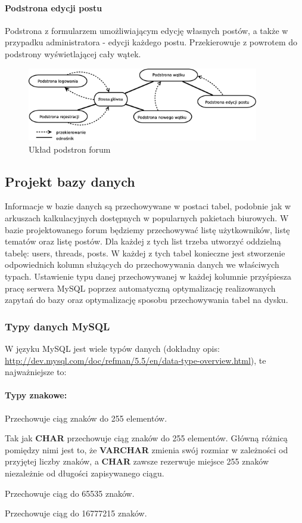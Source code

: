 \documentclass[a4paper,10pt]{article}
\renewenvironment{description}[1][0pt]
	{\list{}{\labelwidth=0pt \leftmargin=#1
	\let\makelabel\descriptionlabel}}
	{\endlist}
\begin{document}
\paragraph{Podstrona edycji postu} Podstrona z formularzem umożliwiającym edycję własnych postów, a także w przypadku administratora - edycji każdego postu. Przekierowuje z powrotem do podstrony wyświetlającej cały wątek. \\

\begin{figure}[htbp]
\centering
\includegraphics[width=0.9\textwidth]{subp.eps}
\caption{Układ podstron forum}
\end{figure}


\subsection{Projekt bazy danych}
Informacje w bazie danych są przechowywane w postaci tabel, podobnie jak w arkuszach kalkulacyjnych dostępnych w popularnych pakietach biurowych. W bazie projektowanego forum będziemy przechowywać listę użytkowników, listę tematów oraz listę postów. Dla każdej z tych list trzeba utworzyć oddzielną tabelę: users, threads, posts. W każdej z tych tabel konieczne jest stworzenie odpowiednich kolumn służących do przechowywania danych we właściwych typach. Ustawienie typu danej przechowywanej w każdej kolumnie przyśpiesza pracę serwera MySQL poprzez automatyczną optymalizację realizowanych zapytań do bazy oraz optymalizację sposobu przechowywania tabel na dysku.
\subsubsection{Typy danych MySQL}
W języku MySQL jest wiele typów danych 
(dokładny opis: \href{http://dev.mysql.com/doc/refman/5.5/en/data-type-overview.html}{http://dev.mysql.com/doc/refman/5.5/en/data-type-overview.html}), te najważniejsze to:

\paragraph{Typy znakowe:}
\begin{description}[5mm]
\item[CHAR] Przechowuje ciąg znaków do 255 elementów.
\item[VARCHAR] Tak jak \textbf{CHAR} przechowuje ciąg znaków do 255 elementów. Główną różnicą pomiędzy nimi jest to, że \textbf{VARCHAR} zmienia swój rozmiar w zależności od przyjętej liczby znaków, a \textbf{CHAR} zawsze rezerwuje miejsce 255 znaków niezależnie od długości zapisywanego ciągu.
\item[TEXT] Przechowuje ciąg do 65535 znaków.
\item[MEDIUMTEXT] Przechowuje ciąg do 16777215 znaków.
\end{description}
\end{document}
